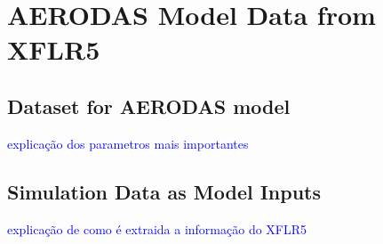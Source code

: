 \chapter{AERODAS Model Data from XFLR5}
\label{chapter:aerodas_xflr5}


\section{Dataset for AERODAS model}


\textcolor{blue}{explicação dos parametros mais importantes}


\section{Simulation Data as Model Inputs}

\textcolor{blue}{explicação de como é extraida a informação do XFLR5}